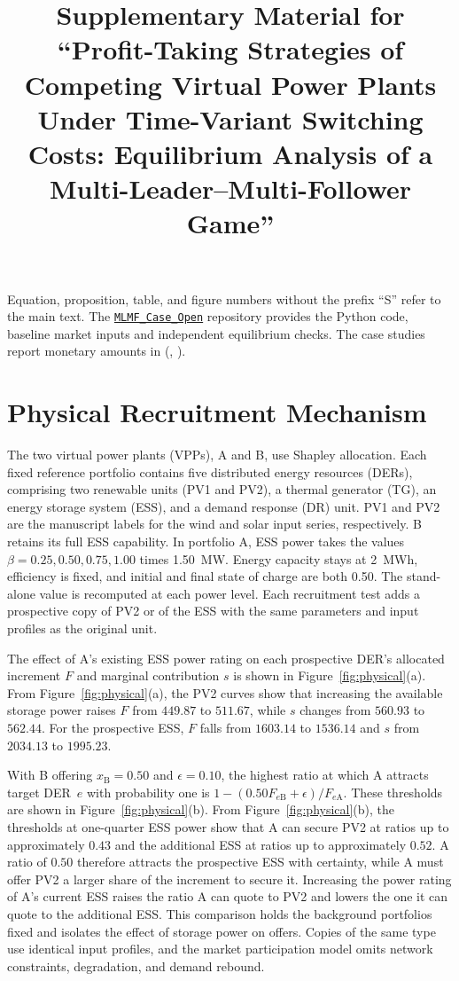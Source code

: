 \documentclass[10pt]{article}
\title{Supplementary Material for ``Profit-Taking Strategies of Competing Virtual Power Plants Under Time-Variant Switching Costs: Equilibrium Analysis of a Multi-Leader--Multi-Follower Game''}
\date{}
\begin{document}
\maketitle
\vspace{-1.5em}
\noindent Equation, proposition, table, and figure numbers without the prefix ``S'' refer to the main text. The \href{https://github.com/SCWang01/MLMF_Case_Open}{\texttt{MLMF\_Case\_Open}} repository provides the Python code, baseline market inputs and independent equilibrium checks. The case studies report monetary amounts in \CurrencyName{} (\CurrencyCode{}, \CurrencySymbol{}).

\section{Physical Recruitment Mechanism}\label{sec:physical}
The two virtual power plants (VPPs), A and B, use Shapley allocation. Each fixed reference portfolio contains five distributed energy resources (DERs), comprising two renewable units (PV1 and PV2), a thermal generator (TG), an energy storage system (ESS), and a demand response (DR) unit. PV1 and PV2 are the manuscript labels for the wind and solar input series, respectively. B retains its full ESS capability. In portfolio A, ESS power takes the values $\beta=0.25,0.50,0.75,1.00$ times 1.50~MW. Energy capacity stays at 2~MWh, efficiency is fixed, and initial and final state of charge are both 0.50. The stand-alone value is recomputed at each power level. Each recruitment test adds a prospective copy of PV2 or of the ESS with the same parameters and input profiles as the original unit.

The effect of A's existing ESS power rating on each prospective DER's allocated increment $F$ and marginal contribution $s$ is shown in Figure~\ref{fig:physical}(a). From Figure~\ref{fig:physical}(a), the PV2 curves show that increasing the available storage power raises $F$ from $449.87$ to $511.67$, while $s$ changes from $560.93$ to $562.44$. For the prospective ESS, $F$ falls from $1603.14$ to $1536.14$ and $s$ from $2034.13$ to $1995.23$.

With B offering $x_{\mathrm B}=0.50$ and $\epsilon=0.10$, the highest ratio at which A attracts target DER~$e$ with probability one is $1-(0.50F_{e\mathrm B}+\epsilon)/F_{e\mathrm A}$. These thresholds are shown in Figure~\ref{fig:physical}(b). From Figure~\ref{fig:physical}(b), the thresholds at one-quarter ESS power show that A can secure PV2 at ratios up to approximately $0.43$ and the additional ESS at ratios up to approximately $0.52$. A ratio of $0.50$ therefore attracts the prospective ESS with certainty, while A must offer PV2 a larger share of the increment to secure it. Increasing the power rating of A's current ESS raises the ratio A can quote to PV2 and lowers the one it can quote to the additional ESS. This comparison holds the background portfolios fixed and isolates the effect of storage power on offers. Copies of the same type use identical input profiles, and the market participation model omits network constraints, degradation, and demand rebound.
\end{document}
